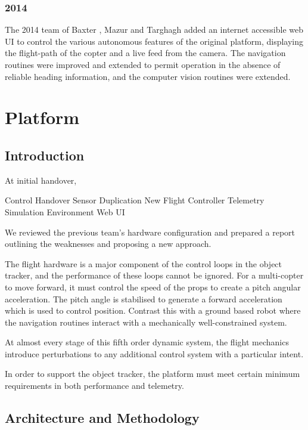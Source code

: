 \documentclass{article}
\begin{document}
      \subsubsection{2014}

        The 2014 team of Baxter \cite{Baxter}, Mazur \cite{Mazur} and Targhagh \cite{Targhagh} added an internet accessible web UI to control the various autonomous features of the original platform, displaying the flight-path of the copter and a live feed from the camera.
        The navigation routines were improved and extended to permit operation in the absence of reliable heading information, and the computer vision routines were extended.

  \section{Platform}
    \subsection{Introduction}
      At initial handover, 

Control Handover
Sensor Duplication
New Flight Controller
Telemetry
Simulation Environment
Web UI

      We reviewed the previous team's hardware configuration and prepared a report outlining the weaknesses and proposing a new approach.
    
      The flight hardware is a major component of the control loops in the object tracker, and the performance of these loops cannot be ignored.
      For a multi-copter to move forward, it must control the speed of the props to create a pitch angular acceleration. The pitch angle is stabilised to generate a forward acceleration which is used to control position.
      Contrast this with a ground based robot where the navigation routines interact with a mechanically well-constrained system.
      
      At almost every stage of this fifth order dynamic system, the flight mechanics introduce perturbations to any additional control system with a particular intent.

      In order to support the object tracker, the platform must meet certain minimum requirements in both performance and telemetry.


    \subsection{Architecture and Methodology}
\end{document}
